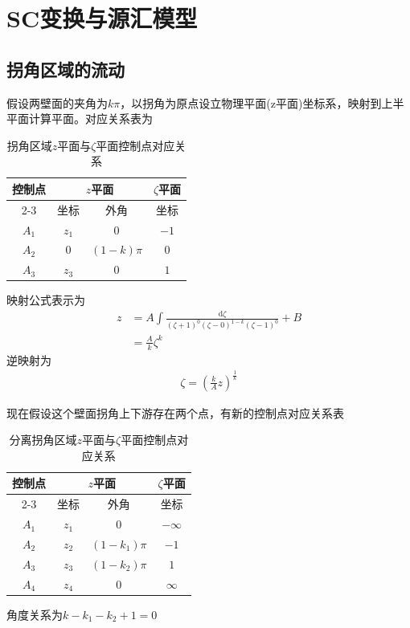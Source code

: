 \section{SC变换与源汇模型}
\subsection{拐角区域的流动}
假设两壁面的夹角为$k\pi$，以拐角为原点设立物理平面(z平面)坐标系，映射到上半平面计算平面。对应关系表为
\begin{table}[htbp] 
    \centering
    \caption{拐角区域$z$平面与$\zeta$平面控制点对应关系}
    \begin{tabular}{cccc}
        \toprule
        控制点 & \multicolumn{2}{c}{$z$平面} & $\zeta$平面 \\
        \cmidrule(lr){2-3} %
                         & 坐标 & 外角 & 坐标 \\
        \midrule
        $A_{1}$ & $z_{1}$     & $0$                 & $-1$ \\
        $A_{2}$ & $0$            & $(1-k)\pi$       & $0$      \\
        $A_{3}$ & $z_{3}$             & $0$       & $1$       \\
        \bottomrule
    \end{tabular}
\end{table}

映射公式表示为
\begin{align}
    z&=A\int\frac{\mathrm{d}\zeta}{(\zeta+1)^{0}(\zeta-0)^{1-k}(\zeta-1)^{0}}+B\\
    &=\frac{A}{k}\zeta^{k}
\end{align}
逆映射为
\begin{align}
    \zeta=\left(\frac{k}{A}z\right)^{\frac{1}{k}}
\end{align}

现在假设这个壁面拐角上下游存在两个点，有新的控制点对应关系表
\begin{table}[htbp] 
    \centering
    \caption{分离拐角区域$z$平面与$\zeta$平面控制点对应关系}
    \begin{tabular}{cccc}
        \toprule
        控制点 & \multicolumn{2}{c}{$z$平面} & $\zeta$平面 \\
        \cmidrule(lr){2-3} %
                         & 坐标 & 外角 & 坐标 \\
        \midrule
        $A_{1}$ & $z_{1}$     & $0$                 & $-\infty$ \\
        $A_{2}$ & $z_{2}$            & $(1-k_{1})\pi$       & $-1$      \\
        $A_{3}$ & $z_{3}$             & $(1-k_{2})\pi$       & $1$       \\
        $A_{4}$ & $z_{4}$             & $0$       & $\infty$       \\
        \bottomrule
    \end{tabular}
\end{table}
角度关系为$k-k_{1}-k_{2}+1=0$

